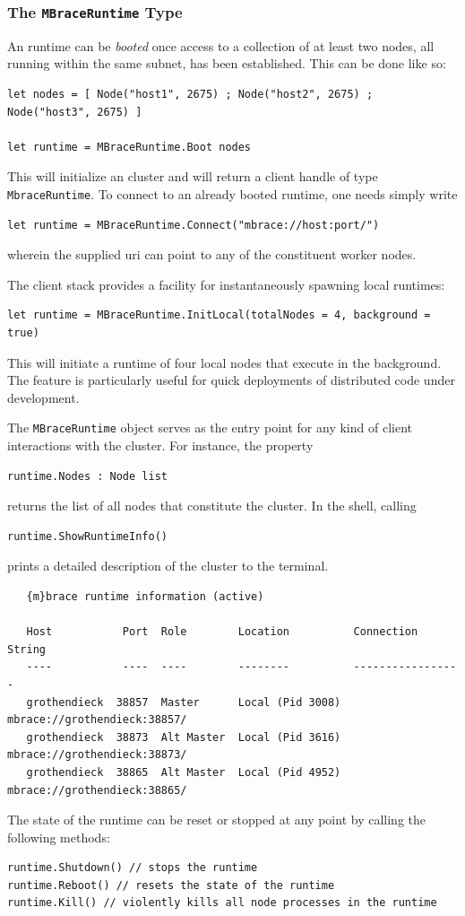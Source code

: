 \subsubsection*{The \texttt{MBraceRuntime} Type}

An \mbrace{} runtime can be \emph{booted} once access to a collection of at least two nodes,
all running within the same subnet, has been established. This can be done like so:
\begin{lstlisting}
let nodes = [ Node("host1", 2675) ; Node("host2", 2675) ; Node("host3", 2675) ]

let runtime = MBraceRuntime.Boot nodes
\end{lstlisting}
This will initialize an \mbrace{} cluster and will return a client handle of type
\texttt{MbraceRuntime}. 
%
To connect to an already booted \mbrace{} runtime, one needs simply write
\begin{lstlisting}
let runtime = MBraceRuntime.Connect("mbrace://host:port/")
\end{lstlisting}
wherein the supplied uri can point to any of the constituent worker nodes.

The client stack provides a facility for instantaneously spawning local runtimes:
\begin{lstlisting}
let runtime = MBraceRuntime.InitLocal(totalNodes = 4, background = true)
\end{lstlisting}
This will initiate a runtime of four local nodes that execute in the background.
The feature is particularly useful for quick deployments of distributed code under development.

The \texttt{MBraceRuntime} object serves as the entry point for any kind of client interactions 
with the cluster. For instance, the property
\begin{lstlisting}
runtime.Nodes : Node list
\end{lstlisting}
returns the list of all nodes that constitute the cluster.
In the \mbrace{} shell, calling
\begin{lstlisting}
runtime.ShowRuntimeInfo()
\end{lstlisting}
prints a detailed description of the cluster to the terminal.
\begin{verbatim}
   {m}brace runtime information (active)                                               

   Host           Port  Role        Location          Connection String            
   ----           ----  ----        --------          -----------------            
   grothendieck  38857  Master      Local (Pid 3008)  mbrace://grothendieck:38857/ 
   grothendieck  38873  Alt Master  Local (Pid 3616)  mbrace://grothendieck:38873/ 
   grothendieck  38865  Alt Master  Local (Pid 4952)  mbrace://grothendieck:38865/ 
\end{verbatim}
The state of the runtime can be reset or stopped at any point by calling the following methods:
\begin{lstlisting}
runtime.Shutdown() // stops the runtime
runtime.Reboot() // resets the state of the runtime
runtime.Kill() // violently kills all node processes in the runtime
\end{lstlisting}

